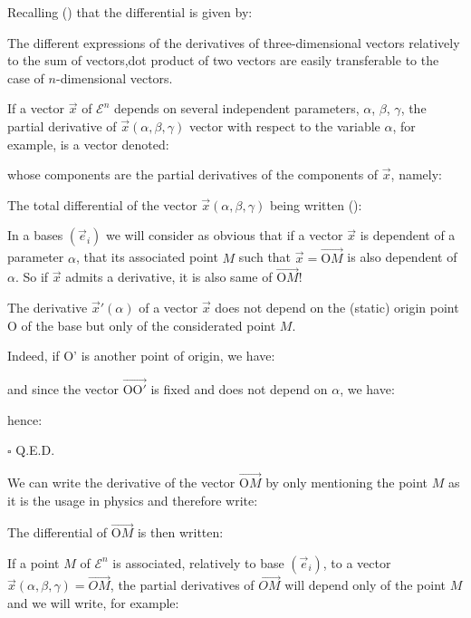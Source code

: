 	Recalling () that the differential is given by:
	
	The different expressions of the derivatives of  three-dimensional vectors relatively to the sum of vectors,dot product of two vectors are easily transferable to the case of $n$-dimensional vectors.
	
	If a vector $\vec{x}$ of $\mathcal{E}^n$ depends on several independent parameters, $\alpha$, 
$\beta$, $\gamma$, the partial derivative of $\vec{x}(\alpha,\beta,\gamma)$ vector with respect to the variable $\alpha$, for example, is a vector denoted:
	
	whose components are the partial derivatives of the  components of $\vec{x}$, namely:
	
	The total differential of the vector $\vec{x}(\alpha,\beta,\gamma)$ being written ():
	
	In a bases $(\vec{e}_i)$ we will consider as obvious that if a vector $\vec{x}$ is dependent of a parameter $\alpha$, that its associated point $M$ such that $\vec{x}=\overrightarrow{\text{O}M}$ is also dependent of $\alpha$. So if $\vec{x}$ admits a derivative, it is also same of $\overrightarrow{\text{O}M}$!
	
	\begin{theorem}
	The derivative $\vec{x}'(\alpha)$ of a vector $\vec{x}$ does not depend on the (static) origin point O of the base but only of the considerated point $M$.
	\end{theorem}
	\begin{dem}
	Indeed, if O' is another point of origin, we have:
	
	and since the vector $\overrightarrow{\text{OO}'}$ is fixed and does not depend on $\alpha$, we have:
	
	hence:
	
	\begin{flushright}
		$\square$  Q.E.D.
	\end{flushright}
	\end{dem}
	We can write the derivative of the vector $\overrightarrow{\text{O}M}$ by only mentioning the point $M$ as it is the usage in physics and therefore write:
	
	The differential of $\overrightarrow{\text{O}M}$ is then written:
	
	If a point $M$ of $\mathcal{E}^n$ is associated, relatively to base $(\vec{e}_i)$, to a vector $\vec{x}(\alpha,\beta,\gamma)=\overrightarrow{OM}$, the partial derivatives of $\overrightarrow{OM}$ will depend only of the point $M$ and we will write, for example:
	

